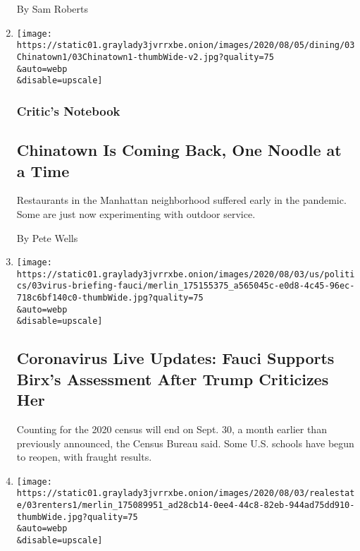 \begin{enumerate}
  By Sam Roberts
\item
  \href{/2020/08/03/dining/chinatown-outdoor-dining-coronavirus.html}{}

  \texttt{[image: https://static01.graylady3jvrrxbe.onion/images/2020/08/05/dining/03Chinatown1/03Chinatown1-thumbWide-v2.jpg?quality=75\\\&auto=webp\\\&disable=upscale]}

  \hypertarget{critics-notebook}{%
  \subsubsection{Critic's Notebook}\label{critics-notebook}}

  \hypertarget{chinatown-is-coming-back-one-noodle-at-a-time}{%
  \subsection{Chinatown Is Coming Back, One Noodle at a
  Time}\label{chinatown-is-coming-back-one-noodle-at-a-time}}

  Restaurants in the Manhattan neighborhood suffered early in the
  pandemic. Some are just now experimenting with outdoor service.

  By Pete Wells
\item
  \href{/2020/08/03/world/coronavirus-covid-19.html}{}

  \texttt{[image: https://static01.graylady3jvrrxbe.onion/images/2020/08/03/us/politics/03virus-briefing-fauci/merlin\_175155375\_a565045c-e0d8-4c45-96ec-718c6bf140c0-thumbWide.jpg?quality=75\\\&auto=webp\\\&disable=upscale]}

  \hypertarget{coronavirus-live-updates-fauci-supports-birxs-assessment-after-trump-criticizes-her}{%
  \subsection{Coronavirus Live Updates: Fauci Supports Birx's Assessment
  After Trump Criticizes
  Her}\label{coronavirus-live-updates-fauci-supports-birxs-assessment-after-trump-criticizes-her}}

  Counting for the 2020 census will end on Sept. 30, a month earlier
  than previously announced, the Census Bureau said. Some U.S. schools
  have begun to reopen, with fraught results.
\item
  \href{/2020/08/03/realestate/coronavirus-roommate-renters.html}{}

  \texttt{[image: https://static01.graylady3jvrrxbe.onion/images/2020/08/03/realestate/03renters1/merlin\_175089951\_ad28cb14-0ee4-44c8-82eb-944ad75dd910-thumbWide.jpg?quality=75\\\&auto=webp\\\&disable=upscale]}


\end{enumerate}
